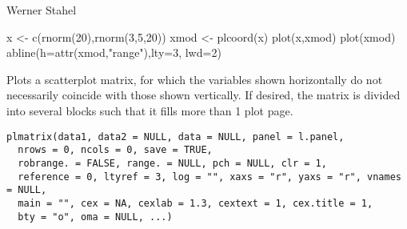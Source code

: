 \documentclass{article}
\begin{document}
\begin{Author}\relax
Werner Stahel
\end{Author}
\begin{SeeAlso}\relax
{}
\end{SeeAlso}
\begin{Examples}
\begin{ExampleCode}
  x <- c(rnorm(20),rnorm(3,5,20))
  xmod <- plcoord(x)
  plot(x,xmod)
  plot(xmod)
  abline(h=attr(xmod,"range"),lty=3, lwd=2)
\end{ExampleCode}
\end{Examples}

\begin{Description}\relax
Plots a scatterplot matrix, for which the variables shown horizontally
do not necessarily coincide with those shown vertically. If desired,
the matrix is divided into several blocks such that it fills more than
1 plot page.
\end{Description}
\begin{Usage}
\begin{verbatim}
plmatrix(data1, data2 = NULL, data = NULL, panel = l.panel,
  nrows = 0, ncols = 0, save = TRUE,
  robrange. = FALSE, range. = NULL, pch = NULL, clr = 1, 
  reference = 0, ltyref = 3, log = "", xaxs = "r", yaxs = "r", vnames = NULL,
  main = "", cex = NA, cexlab = 1.3, cextext = 1, cex.title = 1,
  bty = "o", oma = NULL, ...)
\end{verbatim}
\end{Usage}
\end{document}
